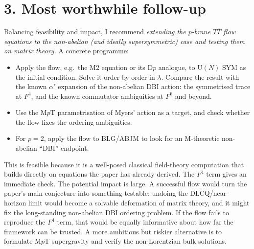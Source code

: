 \documentclass[11pt]{article}
\begin{document}
\section*{3. Most worthwhile follow-up}
Balancing feasibility and impact, I recommend \emph{extending the $p$-brane
$T\bar T$ flow equations to the non-abelian (and ideally supersymmetric) case
and testing them on matrix theory.} A concrete programme:
\begin{itemize}
\item Apply the flow, e.g.\ the M2 equation or its D$p$ analogue, to
U$(N)$ SYM as the initial condition. Solve it order by order in $\lambda$.
Compare the result with the known $\alpha'$ expansion of the non-abelian DBI
action: the symmetrised trace at $F^4$, and the known commutator ambiguities at
$F^6$ and beyond.
\item Use the M$p$T parametrisation of Myers' action as a target, and check
whether the flow fixes the ordering ambiguities.
\item For $p=2$, apply the flow to BLG/ABJM to look for an M-theoretic
non-abelian ``DBI'' endpoint.
\end{itemize}
This is feasible because it is a well-posed classical field-theory computation
that builds directly on equations the paper has already derived. The
$F^4$ term gives an immediate check. The potential impact is large. A successful
flow would turn the paper's main conjecture into something testable: undoing
the DLCQ/near-horizon limit would become a solvable deformation of matrix
theory, and it might fix the long-standing non-abelian DBI ordering problem.
If the flow fails to reproduce the $F^4$ term, that would be equally
informative about how far the framework can be trusted. A more ambitious but
riskier alternative is to formulate M$p$T supergravity and verify the
non-Lorentzian bulk solutions.
\end{document}

